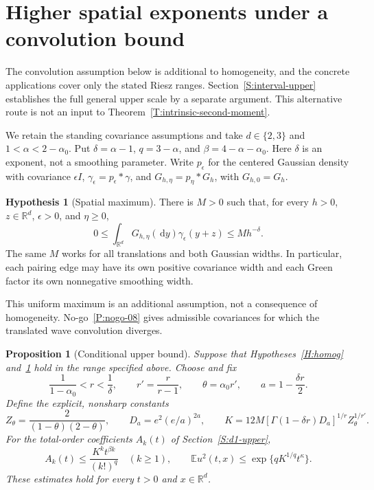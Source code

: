 \documentclass[12pt,oneside,openany]{book}
\numberwithin{equation}{section}
\newtheorem{proposition}[theorem]{Proposition}
\theoremstyle{nogostyle}
\theoremstyle{definition}
\newtheorem{hypothesis}[theorem]{Hypothesis}
\newcommand{\R}{\mathbb{R}}
\newcommand{\E}{\mathbb{E}}
\newcommand{\ud}{\,\mathrm{d}}
\begin{document}
\section{Higher spatial exponents under a convolution bound}
\label{S:higher-alpha}

The convolution assumption below is additional to homogeneity, and the concrete
applications cover only the stated Riesz ranges. Section~\ref{S:interval-upper}
establishes the full general upper scale by a separate argument. This
alternative route is not an input to Theorem~\ref{T:intrinsic-second-moment}.

We retain the standing covariance assumptions and take $d \in \{2,3\}$ and $1 <
\alpha < 2-\alpha_0$. Put $\delta = \alpha-1$, $q = 3-\alpha$, and $\beta =
4-\alpha-\alpha_0$. Here $\delta$ is an exponent, not a smoothing parameter.
Write $p_\epsilon$ for the centered Gaussian density with covariance $\epsilon
I$, $\gamma_\epsilon = p_\epsilon*\gamma$, and $G_{h,\eta} = p_\eta*G_h$, with
$G_{h,0} = G_h$.

\begin{hypothesis}[Spatial maximum]\label{H:spatial-maximum}
  There is $M > 0$ such that, for every $h > 0$, $z \in \R^d$, $\epsilon > 0$,
  and $\eta \ge 0$,
  \begin{equation}\label{E:higher-convolution}
    0\le\int_{\R^d}G_{h,\eta}(\ud y)\gamma_\epsilon(y+z)
    \le M h^{-\delta}.
  \end{equation}
  The same $M$ works for all translations and both Gaussian widths. In
  particular, each pairing edge may have its own positive covariance width and
  each Green factor its own nonnegative smoothing width.
\end{hypothesis}

This uniform maximum is an additional assumption, not a consequence of
homogeneity. No-go~\ref{P:nogo-08} gives admissible covariances for which
the translated wave convolution diverges.


\begin{proposition}[Conditional upper bound]\label{P:higher-transfer}
  Suppose that Hypotheses~\ref{H:homog} and~\ref{H:spatial-maximum} hold in the
  range specified above. Choose and fix
  \[
    \frac1{1-\alpha_0}<r<\frac1\delta,\qquad
    r'=\frac r{r-1},\qquad \theta=\alpha_0r',\qquad
    a=1-\frac{\delta r}{2}.
  \]
  Define the explicit, nonsharp constants
  \begin{equation}\label{E:higher-constants}
    Z_\theta=\frac2{(1-\theta)(2-\theta)},\qquad
    D_a=e^2(e/a)^{2a},\qquad
    K=12M[\Gamma(1-\delta r)D_a]^{1/r}Z_\theta^{1/r'}.
  \end{equation}
  For the total-order coefficients $A_k(t)$ of Section~\ref{S:d1-upper},
  \begin{equation}\label{E:higher-bound}
    A_k(t)\le\frac{K^kt^{\beta k}}{(k!)^q}\quad(k\ge1),
    \qquad \E u^2(t,x)\le\exp\{qK^{1/q}t^\kappa\}.
  \end{equation}
  These estimates hold for every $t > 0$ and $x \in \R^d$.
\end{proposition}
\end{document}
